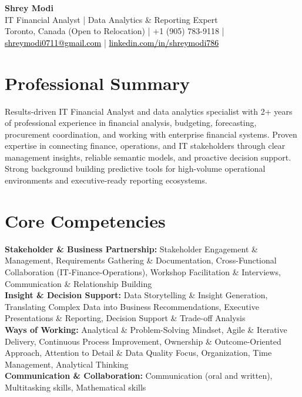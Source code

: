 \documentclass[10.5pt,letterpaper]{article}
\begin{document}
\begin{center}
  {\Huge \bfseries \color{accent} Shrey Modi}\\[0.3em]
  {\normalsize IT Financial Analyst | Data Analytics \& Reporting Expert}\\[0.1em]
  {\small Toronto, Canada (Open to Relocation) | +1 (905) 783-9118 | \href{mailto:shreymodi0711@gmail.com}{\textcolor{black}{shreymodi0711@gmail.com}} | \href{https://linkedin.com/in/shreymodi786}{\textcolor{black}{linkedin.com/in/shreymodi786}}}
\end{center}
\vspace{-12pt}

\section{Professional Summary}
\noindent Results-driven IT Financial Analyst and data analytics specialist with 2+ years of professional experience in financial analysis, budgeting, forecasting, procurement coordination, and working with enterprise financial systems. Proven expertise in connecting finance, operations, and IT stakeholders through clear management insights, reliable semantic models, and proactive decision support. Strong background building predictive tools for high-volume operational environments and executive-ready reporting ecosystems.

\section{Core Competencies}
\noindent
\textbf{Stakeholder \& Business Partnership:} Stakeholder Engagement \& Management, Requirements Gathering \& Documentation, Cross-Functional Collaboration (IT-Finance-Operations), Workshop Facilitation \& Interviews, Communication \& Relationship Building\\\textbf{Insight \& Decision Support:} Data Storytelling \& Insight Generation, Translating Complex Data into Business Recommendations, Executive Presentations \& Reporting, Decision Support \& Trade-off Analysis\\\textbf{Ways of Working:} Analytical \& Problem-Solving Mindset, Agile \& Iterative Delivery, Continuous Process Improvement, Ownership \& Outcome-Oriented Approach, Attention to Detail \& Data Quality Focus, Organization, Time Management, Analytical Thinking\\\textbf{Communication \& Collaboration:} Communication (oral and written), Multitasking skills, Mathematical skills
\end{document}
